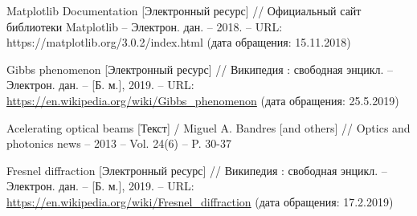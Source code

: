 \begin{thebibliography}{20}
 Matplotlib Documentation [Электронный ресурс] // Официальный сайт
библиотеки Matplotlib – Электрон. дан. – 2018. -- URL:
https://matplotlib.org/3.0.2/index.html (дата обращения: 15.11.2018)



	Gibbs phenomenon [Электронный ресурс] // Википедия : свободная энцикл. –
Электрон. дан. – [Б. м.], 2019. – URL: \url{https://en.wikipedia.org/wiki/Gibbs_phenomenon} (дата обращения: 25.5.2019)

Acelerating optical beams [Текст] / Miguel A. Bandres [and others]  // Optics and photonics news – 2013 – Vol. 24(6) –
P. 30-37

	Fresnel diffraction [Электронный ресурс] // Википедия : свободная энцикл. –
Электрон. дан. – [Б. м.], 2019. – URL: \url{https://en.wikipedia.org/wiki/Fresnel_diffraction} (дата обращения:
17.2.2019)






\end{thebibliography}
	

\newpage

\titleformat{\subsection}[block]{\sloppy \bfseries \hspace{1.2cm} }{\thesubsection}{0.5em}{}
\setlength{\droptitle}{-1cm}
